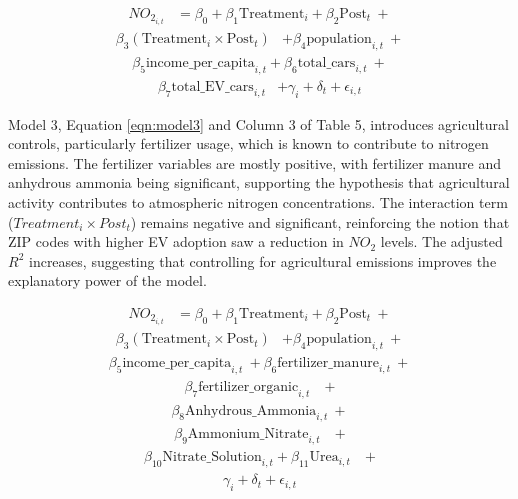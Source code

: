 \documentclass[12pt]{article}
\begin{document}
\begin{multicols}{2}
		\begin{align}
			NO_{2_{i,t}} &= \beta_0 + \beta_1 \text{Treatment}_{i} + \beta_2 \text{Post}_{t}\ + \nonumber \end{align} \begin{align}
			\beta_3 (\text{Treatment}_{i} \times \text{Post}_{t})
			& + \beta_4 \text{population}_{i,t}\ + \nonumber \end{align} \begin{align} \beta_5 \text{income\_per\_capita}_{i,t} 
			+ \beta_6 \text{total\_cars}_{i,t}\ + \nonumber \end{align} \begin{align}\beta_7 \text{total\_EV\_cars}_{i,t}
			& + \gamma_i + \delta_t + \epsilon_{i,t} \label{eqn:model2}
		\end{align}
		
		Model 3, Equation \eqref{eqn:model3} and Column 3 of Table 5, introduces agricultural controls, particularly fertilizer usage, which is known to contribute to nitrogen emissions. The fertilizer variables are mostly positive, with fertilizer manure and anhydrous ammonia being significant, supporting the hypothesis that agricultural activity contributes to atmospheric nitrogen concentrations. The interaction term ($Treatment_i \times Post_t$) remains negative and significant, reinforcing the notion that ZIP codes with higher EV adoption saw a reduction in $NO_2$ levels. The adjusted $ R^2$ increases, suggesting that controlling for agricultural emissions improves the explanatory power of the model.
		
		\begin{align}
			NO_{2_{i,t}} &= \beta_0 + \beta_1 \text{Treatment}_{i} + \beta_2 \text{Post}_{t}\ + \nonumber \end{align} \begin{align}
			\beta_3 (\text{Treatment}_{i} \times \text{Post}_{t})
			& + \beta_4 \text{population}_{i,t}\ + \nonumber \end{align} \begin{align}
			\beta_5 \text{income\_per\_capita}_{i,t}\ + \beta_6 \text{fertilizer\_manure}_{i,t}\ + \nonumber \end{align} \begin{align} \beta_7 \text{fertilizer\_organic}_{i,t}
			& \ + \nonumber \end{align} \begin{align} \beta_8 \text{Anhydrous\_Ammonia}_{i,t}\ + \nonumber  \end{align} \begin{align} \beta_9 \text{Ammonium\_Nitrate}_{i,t}
			&\ + \nonumber \end{align} \begin{align} \beta_{10} \text{Nitrate\_Solution}_{i,t} + \beta_{11} \text{Urea}_{i,t}
			&\ + \nonumber \end{align} \begin{align}  \gamma_i + \delta_t + \epsilon_{i,t} \label{eqn:model3}
		\end{align}
		

\end{multicols}
\end{document}

